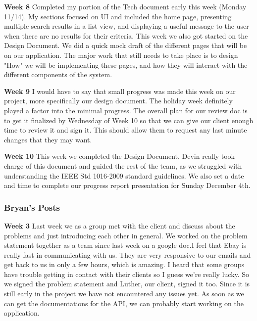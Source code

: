 \documentclass[journal,compsoc, 10pt, draftclsnofoot, onecolumn]{IEEEtran}
\begin{document}
\textbf{Week 8}\newline
Completed my portion of the Tech document early this week (Monday 11/14). 
My sections focused on UI and included the home page, presenting multiple 
search results in a list view, and displaying a useful message to the user when 
there are no results for their criteria. This week we also got started on the 
Design Document. We did a quick mock draft of the different pages that will 
be on our application. The major work that still needs to take place is to design 
"How" we will be implementing these pages, and how they will interact with
 the different components of the system.\newline

\textbf{Week 9}\newline
I would have to say that small progress was made this week on our project, 
more specifically our design document. The holiday week definitely played a 
factor into the minimal progress. The overall plan for our review doc is to get 
it finalized by Wednesday of Week 10 so that we can give our client enough 
time to review it and sign it. This should allow them to request any last 
minute changes that they may want.\newline

\textbf{Week 10}\newline
This week we completed the Design Document. Devin really took charge of 
this document and guided the rest of the team, as we struggled with 
understanding the IEEE Std 1016-2009 standard guidelines. We also set 
a date and time to complete our progress report presentation for Sunday
 December 4th.\newline

\subsubsection*{Bryan's Posts}
\textbf{Week 3}\newline
Last week we as a group met with the client and discuss about the problems and just 
introducing each other in general. We worked on the problem statement together as 
a team since last week on a google doc.I feel that Ebay is really fast in communicating 
with us. They are very responsive to our emails and get back to us in only a few hours,
 which is amazing. 
I heard that some groups have trouble getting in contact with their clients so I guess 
we're really lucky.
So we signed the problem statement and Luther, our client, signed it too. Since it is 
still early in the project we have not encountered any issues yet. As soon as we can 
get the documentations for the API, we can probably start working on the application.
\newline
\end{document}
